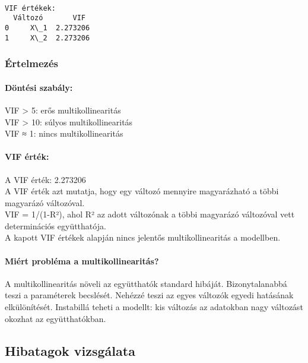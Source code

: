 \documentclass[11pt]{article}
\begin{document}
    \begin{Verbatim}[commandchars=\\\{\}]

VIF értékek:
  Változó       VIF
0     X\_1  2.273206
1     X\_2  2.273206
    \end{Verbatim}

    \subsubsection{Értelmezés}\label{uxe9rtelmezuxe9s}

\paragraph{Döntési szabály:}\label{duxf6ntuxe9si-szabuxe1ly}

VIF \textgreater{} 5: erős multikollinearitás\\
VIF \textgreater{} 10: súlyos multikollinearitás\\
VIF ≈ 1: nincs multikollinearitás

\paragraph{VIF érték:}\label{vif-uxe9rtuxe9k}

A VIF érték: 2.273206\\
A VIF érték azt mutatja, hogy egy változó mennyire magyarázható a többi
magyarázó változóval.\\
VIF = 1/(1-R²), ahol R² az adott változónak a többi magyarázó változóval
vett determinációs együtthatója.\\
A kapott VIF értékek alapján nincs jelentős multikollinearitás a
modellben.

\paragraph{Miért probléma a
multikollinearitás?}\label{miuxe9rt-probluxe9ma-a-multikollinearituxe1s}

A multikollinearitás növeli az együtthatók standard hibáját.
Bizonytalanabbá teszi a paraméterek becslését. Nehézzé teszi az egyes
változók egyedi hatásának elkülönítését. Instabillá teheti a modellt:
kis változás az adatokban nagy változást okozhat az együtthatókban.

    \subsection{Hibatagok vizsgálata}\label{hibatagok-vizsguxe1lata}
\end{document}
